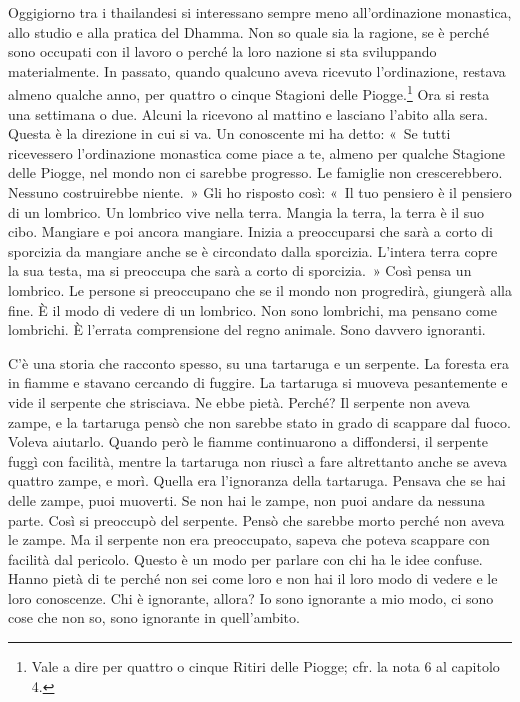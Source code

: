 Oggigiorno tra i thailandesi si interessano sempre meno all'ordinazione
monastica, allo studio e alla pratica del Dhamma. Non so quale sia la
ragione, se è perché sono occupati con il lavoro o perché la loro
nazione si sta sviluppando materialmente. In passato, quando qualcuno
aveva ricevuto l'ordinazione, restava almeno qualche anno, per quattro o
cinque Stagioni delle Piogge.\footnote{Vale a dire per quattro o cinque
  Ritiri delle Piogge; cfr. la nota 6 al capitolo 4.} Ora si resta una
settimana o due. Alcuni la ricevono al mattino e lasciano l'abito alla
sera. Questa è la direzione in cui si va. Un conoscente mi ha detto:
«~Se tutti ricevessero l'ordinazione monastica come piace a te, almeno
per qualche Stagione delle Piogge, nel mondo non ci sarebbe progresso.
Le famiglie non crescerebbero. Nessuno costruirebbe niente.~» Gli ho
risposto così: «~Il tuo pensiero è il pensiero di un lombrico. Un
lombrico vive nella terra. Mangia la terra, la terra è il suo cibo.
Mangiare e poi ancora mangiare. Inizia a preoccuparsi che sarà a corto
di sporcizia da mangiare anche se è circondato dalla sporcizia. L'intera
terra copre la sua testa, ma si preoccupa che sarà a corto di
sporcizia.~» Così pensa un lombrico. Le persone si preoccupano che se il
mondo non progredirà, giungerà alla fine. È il modo di vedere di un
lombrico. Non sono lombrichi, ma pensano come lombrichi. È l'errata
comprensione del regno animale. Sono davvero ignoranti.

C'è una storia che racconto spesso, su una tartaruga e un serpente. La
foresta era in fiamme e stavano cercando di fuggire. La tartaruga si
muoveva pesantemente e vide il serpente che strisciava. Ne ebbe pietà.
Perché? Il serpente non aveva zampe, e la tartaruga pensò che non
sarebbe stato in grado di scappare dal fuoco. Voleva aiutarlo. Quando
però le fiamme continuarono a diffondersi, il serpente fuggì con
facilità, mentre la tartaruga non riuscì a fare altrettanto anche se
aveva quattro zampe, e morì. Quella era l'ignoranza della tartaruga.
Pensava che se hai delle zampe, puoi muoverti. Se non hai le zampe, non
puoi andare da nessuna parte. Così si preoccupò del serpente. Pensò che
sarebbe morto perché non aveva le zampe. Ma il serpente non era
preoccupato, sapeva che poteva scappare con facilità dal pericolo.
Questo è un modo per parlare con chi ha le idee confuse. Hanno pietà di
te perché non sei come loro e non hai il loro modo di vedere e le loro
conoscenze. Chi è ignorante, allora? Io sono ignorante a mio modo, ci
sono cose che non so, sono ignorante in quell'ambito.

